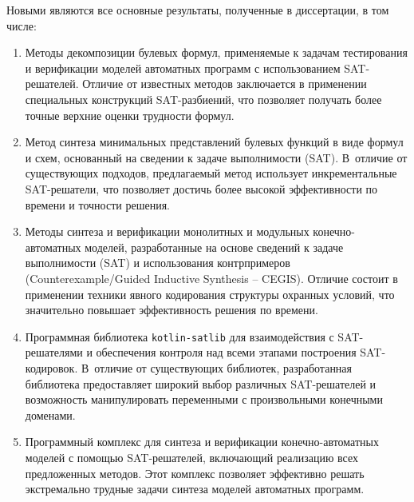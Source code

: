 \novelty
%
Новыми являются все основные результаты, полученные в диссертации, в том числе:
\begin{enumerate}[beginpenalty=10000]
    \item Методы декомпозиции булевых формул, применяемые к задачам тестирования и верификации моделей автоматных программ с использованием SAT-решателей. Отличие от известных методов заключается в применении специальных конструкций SAT-разбиений, что позволяет получать более точные верхние оценки трудности формул.

    \item Метод синтеза минимальных представлений булевых функций в виде формул и схем, основанный на сведении к задаче выполнимости (SAT). В~отличие от существующих подходов, предлагаемый метод использует инкрементальные SAT-решатели, что позволяет достичь более высокой эффективности по времени и точности решения.

    \item Методы синтеза и верификации монолитных и модульных конечно-автоматных моделей, разработанные на основе сведений к задаче выполнимости (SAT) и использования контрпримеров (Counter\-example\-/Guided Inductive Synthesis \--- CEGIS). Отличие состоит в применении техники явного кодирования структуры охранных условий, что значительно повышает эффективность решения по времени.

    \item Программная библиотека \texttt{kotlin-satlib} для взаимодействия с SAT-решателями и обеспечения контроля над всеми этапами построения SAT-кодировок. В~отличие от существующих библиотек, разработанная библиотека предоставляет широкий выбор различных SAT-решателей и возможность манипулировать переменными с произвольными конечными доменами.

    \item Программный комплекс  для синтеза и верификации конечно-автоматных моделей с помощью SAT-решателей, включающий реализацию всех предложенных методов. Этот комплекс позволяет эффективно решать экстремально трудные задачи синтеза моделей автоматных программ.
\end{enumerate}


